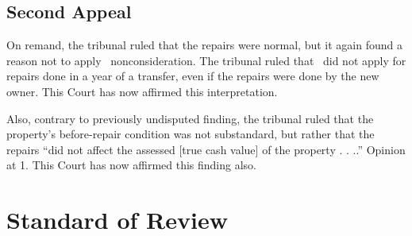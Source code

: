 \documentclass[12pt,\documentclassflag]{michiganCourtOfAppealsBrief}
\begin{document}

\subsection{Second Appeal}

On remand, the tribunal ruled that the repairs were normal, but it again found a reason not to apply \mathieuGast\ nonconsideration. The tribunal ruled that  \mathieuGast\ did not apply for repairs done in a year of a transfer, even if the repairs were done by the new owner.
This Court has now affirmed this interpretation.

Also, contrary to previously undisputed finding, the tribunal ruled that the property's before-repair condition was not substandard, but rather that the repairs ``did not affect the assessed [true cash value] of the property . . ..'' Opinion at 1. This Court has now affirmed this finding also.


\section{Standard of Review}
\end{document}
